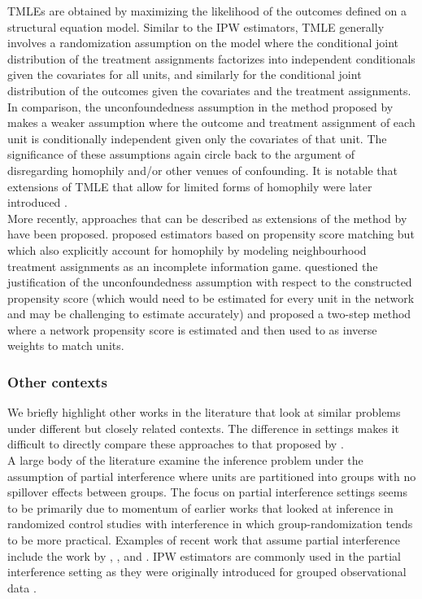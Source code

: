 \documentclass[10pt]{article}
\begin{document}
TMLEs are obtained by maximizing the likelihood of the outcomes defined on a structural equation model. Similar to the IPW estimators, TMLE generally involves a randomization assumption \parencite{VanDerLaan:2014} on the model where the conditional joint distribution of the treatment assignments factorizes into independent conditionals given the covariates for all units, and similarly for the conditional joint distribution of the outcomes given the covariates and the treatment assignments. In comparison, the unconfoundedness assumption in the method proposed by \textcite{Forastiere:2021} makes a weaker assumption where the outcome and treatment assignment of each unit is conditionally independent given only the covariates of that unit. The significance of these assumptions again circle back to the argument of disregarding homophily and/or other venues of confounding. It is notable that extensions of TMLE that allow for limited forms of homophily were later introduced \parencite{Ogburn:2017}.
\\

More recently, approaches that can be described as extensions of the method by \textcite{Forastiere:2021} have been proposed. \textcite{Jackson:2020} proposed estimators based on propensity score matching but which also explicitly account for homophily by modeling neighbourhood treatment assignments as an incomplete information game. \textcite{Sanchez:2021} questioned the justification of the unconfoundedness assumption with respect to the constructed propensity score (which would need to be estimated for every unit in the network and may be challenging to estimate accurately) and proposed a two-step method where a network propensity score is estimated and then used to as inverse weights to match units.

\subsubsection{Other contexts}

We briefly highlight other works in the literature that look at similar problems under different but closely related contexts. The difference in settings makes it difficult to directly compare these approaches to that proposed by \textcite{Forastiere:2021}.
\\

A large body of the literature examine the inference problem under the assumption of partial interference where units are partitioned into groups with no spillover effects between groups. The focus on partial interference settings seems to be primarily due to momentum of earlier works \parencite[e.g.,][]{Sobel:2006,Hudgens:2008} that looked at inference in randomized control studies with interference in which group-randomization tends to be more practical. Examples of recent work that assume partial interference include the work by \textcite{Liu:2019}, \textcite{Barkley:2020}, and \textcite{Qu:2021}. IPW estimators are commonly used in the partial interference setting as they were originally introduced for grouped observational data \parencite{Tchetgen:2012}.
\\
\end{document}

